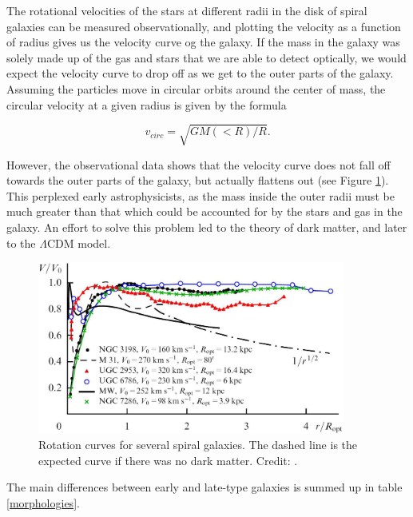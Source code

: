 The rotational velocities of the stars at different radii in the disk of spiral galaxies can be measured observationally, and plotting the velocity as a function of radius gives us the velocity curve og the galaxy. If the mass in the galaxy was solely made up of the gas and stars that we are able to detect optically, we would expect the velocity curve to drop off as we get to the outer parts of the galaxy. Assuming the particles move in circular orbits around the center of mass, the circular velocity at a given radius is given by the formula

\begin{equation}
    v_{circ} = \sqrt{GM(<R)/R}. 
\end{equation}

However, the observational data shows that the velocity curve does not fall off towards the outer parts of the galaxy, but actually flattens out (see Figure \ref{rotation_curves}). This perplexed early astrophysicists, as the mass inside the outer radii must be much greater than that which could be accounted for by the stars and gas in the galaxy. An effort to solve this problem led to the theory of dark matter, and later to the $\Lambda$CDM model.

\begin{figure}
    \centering
    \includegraphics[width=0.9\textwidth]{images/rotation_curves.png}
    \caption{Rotation curves for several spiral galaxies. The dashed line is the expected curve if there was no dark matter. Credit: \cite{Zasov2017}.}
    \label{rotation_curves}
\end{figure}

The main differences between early and late-type galaxies is summed up in table \ref{morphologies}.

